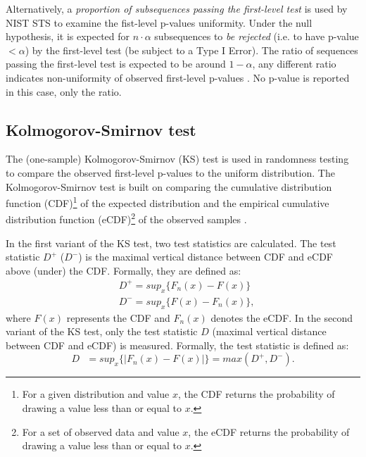 \documentclass[
  digital,     %
  oneside,     %
  nosansbold,  %
  nocolorbold, %
  nolof,         %
  nolot,         %
]{fithesis4}
\begin{document}
Alternatively, a \emph{proportion of subsequences passing the first-level test} is used by NIST STS to examine the fist-level p-values uniformity. Under the null hypothesis, it is expected for $n\cdot\alpha$ subsequences to \emph{be rejected} (i.e. to have p-value $< \alpha$) by the first-level test (be subject to a Type I Error). The ratio of sequences passing the first-level test is expected to be around $1-\alpha$, any different ratio indicates non-uniformity of observed first-level p-values \cite[p. 4-2]{nist_special}. No p-value is reported in this case, only the ratio.


\subsection{Kolmogorov-Smirnov test}
The (one-sample) Kolmogorov-Smirnov (KS) test is used in randomness testing to compare the observed first-level p-values to the uniform distribution. The Kolmogorov-Smirnov test is built on comparing the cumulative distribution function (CDF)\footnote{For a given distribution and value $x$, the CDF returns the probability of drawing a value less than or equal to $x$.} of the expected distribution and the empirical cumulative distribution function (eCDF)\footnote{For a set of observed data and value $x$, the eCDF returns the probability of drawing a value less than or equal to $x$.} of the observed samples \cite[p. 100]{GOF-techniques}. %

In the first variant of the KS test, two test statistics are calculated. The test statistic $D^+$ ($D^-$) is the maximal vertical distance between CDF and eCDF above (under) the CDF. Formally, they are defined as:
\[\begin{split}
    &D^+ = sup_x\{F_n(x) - F(x)\}\\
    &D^- = sup_x\{F(x) - F_n(x)\},
\end{split}
\]
where $F(x)$ represents the CDF and $F_n(x)$ denotes the eCDF. In the second variant of the KS test, only the test statistic $D$ (maximal vertical distance between CDF and eCDF) is measured. Formally, the test statistic is defined as:
\[D \:\:\:= sup_x\{|F_n(x) - F(x)|\} = max(D^+, D^-).\] 
\end{document}
